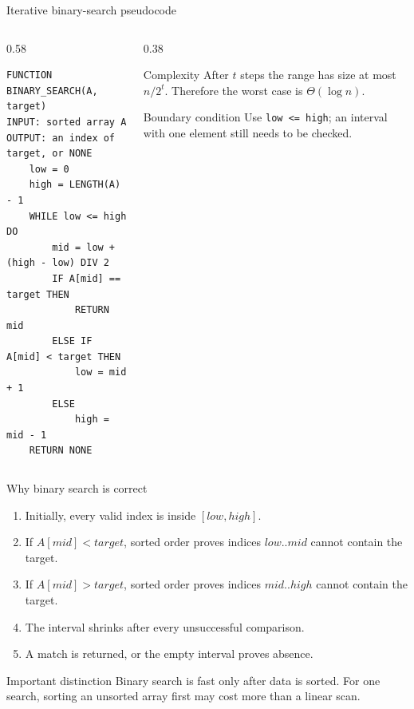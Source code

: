 \documentclass[aspectratio=169]{beamer}
\begin{document}
\begin{frame}[fragile]{Iterative binary-search pseudocode}
  \begin{columns}[T]
    \begin{column}{0.58\textwidth}
\begin{lstlisting}[style=pseudonumbered]
FUNCTION BINARY_SEARCH(A, target)
INPUT: sorted array A
OUTPUT: an index of target, or NONE
    low = 0
    high = LENGTH(A) - 1
    WHILE low <= high DO
        mid = low + (high - low) DIV 2
        IF A[mid] == target THEN
            RETURN mid
        ELSE IF A[mid] < target THEN
            low = mid + 1
        ELSE
            high = mid - 1
    RETURN NONE
\end{lstlisting}
    \end{column}
    \begin{column}{0.38\textwidth}
      \begin{block}{Complexity}
        After $t$ steps the range has size at most $n/2^t$. Therefore the worst
        case is $\Theta(\log n)$.
      \end{block}
      \begin{alertblock}{Boundary condition}
        Use \texttt{low <= high}; an interval with one element still needs to be
        checked.
      \end{alertblock}
    \end{column}
  \end{columns}
\end{frame}

\begin{frame}{Why binary search is correct}
  \small
  \begin{enumerate}
    \item Initially, every valid index is inside $[low,high]$.
    \item If $A[mid]<target$, sorted order proves indices $low..mid$ cannot
      contain the target.
    \item If $A[mid]>target$, sorted order proves indices $mid..high$ cannot
      contain the target.
    \item The interval shrinks after every unsuccessful comparison.
    \item A match is returned, or the empty interval proves absence.
  \end{enumerate}
  \begin{alertblock}{Important distinction}
    Binary search is fast only after data is sorted. For one search, sorting an
    unsorted array first may cost more than a linear scan.
  \end{alertblock}
\end{frame}
\end{document}
